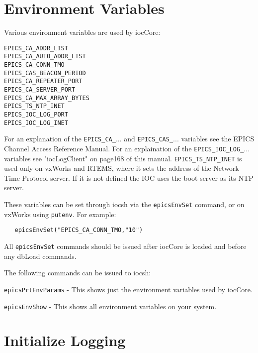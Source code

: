 \section{Environment Variables}

Various environment variables are used by iocCore:

\begin{verbatim}EPICS_CA_ADDR_LIST
EPICS_CA_AUTO_ADDR_LIST
EPICS_CA_CONN_TMO
EPICS_CAS_BEACON_PERIOD
EPICS_CA_REPEATER_PORT
EPICS_CA_SERVER_PORT
EPICS_CA_MAX_ARRAY_BYTES
EPICS_TS_NTP_INET
EPICS_IOC_LOG_PORT
EPICS_IOC_LOG_INET

\end{verbatim}
For an explanation of the \verb|EPICS_CA_|... and \verb|EPICS_CAS_|... variables see the EPICS Channel Access Reference 
Manual. For an explaination of the \verb|EPICS_IOC_LOG_|... variables see "iocLogClient" on page168 of this manual. 
\verb|EPICS_TS_NTP_INET| is used only on vxWorks and RTEMS, where it sets the address of the Network Time Protocol 
server. If it is not defined the IOC uses the boot server as its NTP server.

These variables can be set through iocsh via the \verb|epicsEnvSet| command, or on vxWorks using \verb|putenv|. For example:

\begin{verbatim}   epicsEnvSet("EPICS_CA_CONN_TMO,"10")
\end{verbatim}All \verb|epicsEnvSet| commands should be issued after iocCore is loaded and before any dbLoad commands.

The following commands can be issued to iocsh:

\verb|epicsPrtEnvParams| - This shows just the environment variables used by iocCore.

\verb|epicsEnvShow| - This shows all environment variables on your system.

\section{Initialize Logging}


